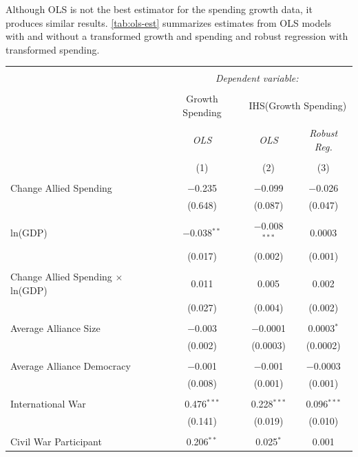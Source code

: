 \documentclass[12pt]{article}
\begin{document}
Although OLS is not the best estimator for the spending growth data, it produces similar results.
\autoref{tab:ols-est} summarizes estimates from OLS models with and without a transformed growth and spending and robust regression with transformed spending. 

\begin{table}[!htbp] \centering 
\begin{tabular}{@{\extracolsep{5pt}}lccc} 
\\[-1.8ex]\hline 
\hline \\[-1.8ex] 
 & \multicolumn{3}{c}{\textit{Dependent variable:}} \\ 
\cline{2-4} 
\\[-1.8ex] & Growth Spending & \multicolumn{2}{c}{IHS(Growth Spending)} \\ 
\\[-1.8ex] & \textit{OLS} & \textit{OLS} & \textit{Robust Reg.} \\ 
\\[-1.8ex] & (1) & (2) & (3)\\ 
\hline \\[-1.8ex] 
 Change Allied Spending & $-$0.235 & $-$0.099 & $-$0.026 \\ 
  & (0.648) & (0.087) & (0.047) \\ 
  & & & \\ 
 ln(GDP) & $-$0.038$^{**}$ & $-$0.008$^{***}$ & 0.0003 \\ 
  & (0.017) & (0.002) & (0.001) \\ 
  & & & \\ 
 Change Allied Spending $\times$ ln(GDP) & 0.011 & 0.005 & 0.002 \\ 
  & (0.027) & (0.004) & (0.002) \\ 
  & & & \\ 	
 Average Alliance Size & $-$0.003 & $-$0.0001 & 0.0003$^{*}$ \\ 
  & (0.002) & (0.0003) & (0.0002) \\ 
  & & & \\ 
 Average Alliance Democracy & $-$0.001 & $-$0.001 & $-$0.0003 \\ 
  & (0.008) & (0.001) & (0.001) \\ 
  & & & \\ 
 International War & 0.476$^{***}$ & 0.228$^{***}$ & 0.096$^{***}$ \\ 
  & (0.141) & (0.019) & (0.010) \\ 
  & & & \\ 
 Civil War Participant & 0.206$^{**}$ & 0.025$^{*}$ & 0.001 \\ 

\end{tabular}
\end{table}
\end{document}
